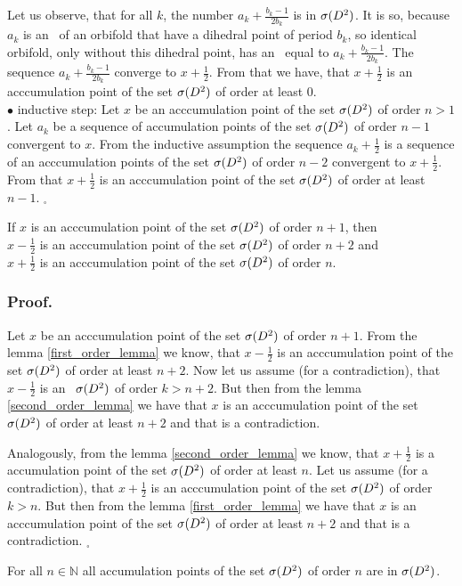 Let us observe, that for all $k$, the number $a_k+\frac{b_k-1}{2b_k}$ is in ${{\sigma}(D^2)}$. 
It is so, because $a_k$ is an \Eoc\ of an orbifold that have a dihedral point of period $b_k$, so 
identical orbifold, only without this dihedral point, has an \Eoc\ equal to $a_k + 
\frac{b_k-1}{2b_k}$. 
The sequence $a_k + \frac{b_k-1}{2b_k}$ converge to $x+\frac{1}{2}$. From that we have, that 
$x + \frac{1}{2}$ is an acccumulation point of the set ${{\sigma}(D^2)}$ of order at least $0$. \\
$\bullet$ inductive step: Let $x$ be an acccumulation point of the set ${{\sigma}(D^2)}$ of order $n > 1$. 
Let $a_k$ be a sequence of accumulation points of the set ${{\sigma}(D^2)}$ of order $n-1$ 
convergent to $x$. 
From the inductive assumption the sequence $a_k + \frac{1}{2}$ is a sequence of an acccumulation
 points of the set ${{\sigma}(D^2)}$ of order $n-2$ convergent to $x + \frac{1}{2}$. From that 
 $x + \frac{1}{2}$ is an acccumulation point of the set ${{\sigma}(D^2)}$ of order at least 
 $n-1$. $_\square$ 
\begin{lemma}\label{third_order_lemma}
If $x$ is an acccumulation point of the set ${{\sigma}(D^2)}$ of order $n+1$, then \\
$x - \frac{1}{2}$ is an acccumulation point of the set ${{\sigma}(D^2)}$ of order $n+2$ and \\
$x + \frac{1}{2}$ is an acccumulation point of the set ${{\sigma}(D^2)}$ of order $n$. 
\end{lemma}
\subsubsection{Proof.} 

Let $x$ be an acccumulation point of the set ${{\sigma}(D^2)}$ of order $n+1$. From the lemma 
 \ref{first_order_lemma} we know, that $x - \frac{1}{2}$ is an acccumulation point of the set 
 ${{\sigma}(D^2)}$ of order at least $n+2$. Now let us assume (for a contradiction), that $x - \frac{1}{2}$ 
 is an \apots\ ${{\sigma}(D^2)}$ of order $k>n+2$. But then from the lemma \ref{second_order_lemma} 
 we have that $x$ is an acccumulation point of the set ${{\sigma}(D^2)}$ of order at least $n+2$ and that 
 is a contradiction. 
 
Analogously, from the lemma \ref{second_order_lemma} we know, that $x + \frac{1}{2}$ is a 
accumulation point of the set ${{\sigma}(D^2)}$ of order at least $n$. Let us assume (for a contradiction), 
that $x+ \frac{1}{2}$ is an acccumulation point of the set ${{\sigma}(D^2)}$ of order $k>n$. But then 
from the lemma \ref{first_order_lemma} we have that $x$ is an acccumulation point of 
the set ${{\sigma}(D^2)}$ 
of order at least $n+2$ and that is a contradiction. $_\square$ 
\begin{lemma}\label{accumulation_points_of_the_set}
For all $n \in \mathbb{N}$ all accumulation points of the set ${{\sigma}(D^2)}$ of order $n$ are in ${{\sigma}(D^2)}$.
\end{lemma}
